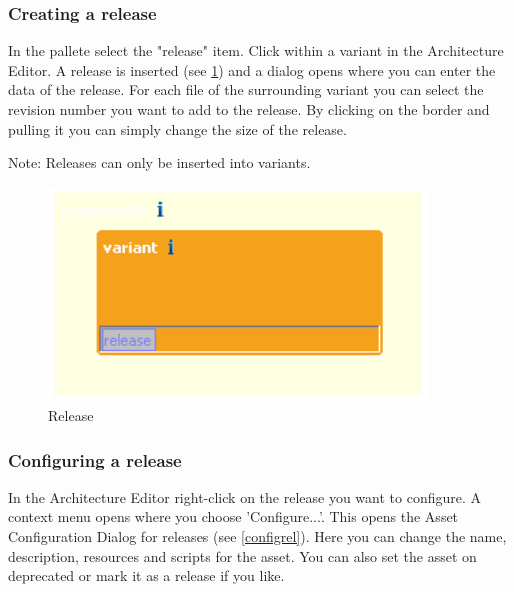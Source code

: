 \subsubsection{Creating a release}

In the pallete select the "release" item. Click within a variant in 
the Architecture Editor. A release is inserted (see \ref{release}) and a dialog opens where you can enter the data of
the release. For each file of the surrounding variant you can select the revision number you want to add to the release. 
By clicking on the border and pulling it you can simply change the size of the release. \par
Note: Releases can only be inserted into variants.

\begin{figure}[h!]
\begin{center}
\includegraphics[width=10cm]{release.png}
   \caption{Release}
\label{release}
\end{center}
\end{figure}\par


\subsubsection{Configuring a release}
In the Architecture Editor right-click on the release you want to configure. 
A context menu opens where you choose 'Configure...'. This opens the Asset Configuration Dialog
for releases (see \ref{configrel}). Here you can change the name, description, resources and scripts for the
asset. You can also set the asset on deprecated or mark it as a release if you like.

